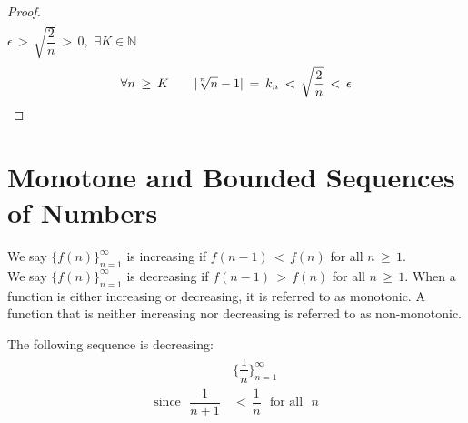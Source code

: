 \begin{exercise}
\begin{proof}
\begin{align*}
    \end{align*}
     $\epsilon \hspace{2pt} > \hspace{2pt} \sqrt{\dfrac{2}{n}} \hspace{2pt} > \hspace{2pt} 0,$  $\exists K \in \mathbb{N}$ 
    \begin{align*}
        \forall n \hspace{2pt} \geq \hspace{2pt} K \hspace{20pt} \lvert \sqrt[\leftroot{2}\uproot{2}n]{n}  - 1 \rvert \hspace{2pt} = \hspace{2pt} k_{n} \hspace{2pt} < \hspace{2pt} \sqrt{\dfrac{2}{n}} \hspace{2pt} < \hspace{2pt} \epsilon 
    \end{align*}
\end{proof}
\end{exercise}

\newpage
\section{Monotone and Bounded Sequences of Numbers}

\begin{definition}
We say $\{f(n)\}_{n=1}^{\infty}$ is increasing if $f(n-1) \hspace{2pt} < \hspace{2pt} f(n)$ for all $n \hspace{2pt} \geq \hspace{2pt} 1$.\\[1ex]
We say $\{f(n)\}_{n=1}^{\infty}$ is decreasing if $f(n-1) \hspace{2pt} > \hspace{2pt} f(n)$ for all $n \hspace{2pt} \geq \hspace{2pt} 1$. When a function is either increasing or decreasing, it is referred to as monotonic. A function that is neither increasing nor decreasing is referred to as non-monotonic.
\end{definition}

\begin{example}
The following sequence is decreasing:
\begin{align*}
    &\Big\{\dfrac{1}{n}\Big\}_{n=1}^{\infty}\\[2ex]
    \text{since } \hspace{4pt} \dfrac{1}{n+1} \hspace{2pt} &< \hspace{2pt} \dfrac{1}{n} \hspace{4pt} \text{ for all } \hspace{4pt} n
\end{align*}
\end{example}

